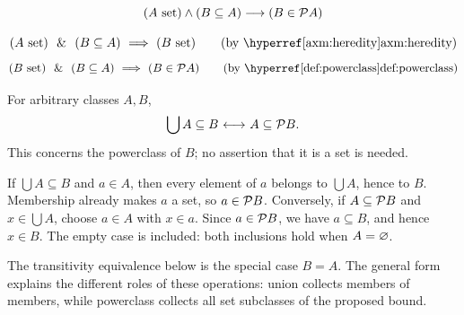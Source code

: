 \begin{theorem}
\[
(A\mathrm{\ set})
\land
(B\subseteq A)
\longrightarrow
(B\in\mathcal{P} A)
\]
\end{theorem}
\Proof
\[
(A\set) \LAND (B\subseteq A) \IMPLIES (B\set)
\tag{by \myref{axm:heredity}}
\]
\[
(B\set) \LAND (B\subseteq A) \IMPLIES (B\in\power A)
\tag{by \myref{def:powerclass}}
\]
\Done


\begin{theorem}
For arbitrary classes $A,B$,
\[
\bigcup A\subseteq B{\ \longleftrightarrow\ } A\subseteq\mathcal{P} B.
\]
This concerns the powerclass of $B$; no assertion that it is a set is needed.
\end{theorem}
\Proof
If $\bigcup A\subseteq B$ and $a\in A$, then every element of $a$
belongs to $\bigcup A$, hence to $B$. Membership already makes $a$ a
set, so $a\in\mathcal{P} B$. Conversely, if $A\subseteq\mathcal{P} B$ and
$x\in\bigcup A$, choose $a\in A$ with $x\in a$. Since
$a\in\mathcal{P} B$, we have $a\subseteq B$, and hence $x\in B$.
The empty case is included: both inclusions hold when $A=\varnothing$.
\Done

The transitivity equivalence below is the special case $B=A$.
The general form explains the different roles of these operations:
union collects members of members, while powerclass collects all set
subclasses of the proposed bound.

